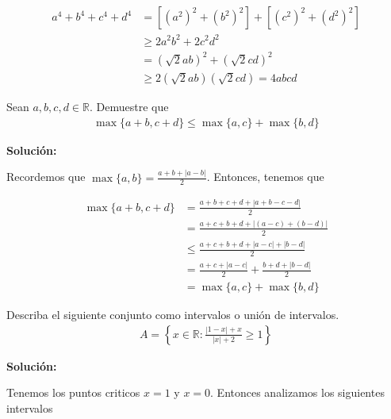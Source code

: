 \documentclass[12pt]{book}
\begin{document}
\begin{align*}
     a^4+b^4+c^4+d^4&=[ (a^2)^2+(b^2)^2]+[(c^2)^2+(d^2)^2] \\
     &\geq2a^2b^2+ 2c^2d^2 \\
     &=(\sqrt{2}ab)^2+(\sqrt{2}cd)^2 \\
     &\geq2(\sqrt{2}ab)(\sqrt{2}cd)=4abcd
\end{align*}

\begin{prob}{}{}
    Sean $a,b,c,d \in \mathbb{R}$. Demuestre que 
    \begin{align*}
        \max\{a+b,c+d\} \leq \max\{a,c\}+\max\{b,d\}
    \end{align*}
\end{prob}

\textbf{Solución:}

Recordemos que $\max\{a,b\}=\frac{a+b+|a-b|}{2}$. Entonces, tenemos que 

\begin{align*}
     \max\{a+b,c+d\} &=\frac{a+b+c+d+|a+b-c-d|}{2} \\
     &=\frac{a+c+b+d+|(a-c)+(b-d)|}{2} \\
     &\leq \frac{a+c+b+d+|a-c|+|b-d|}{2} \\
     &=\frac{a+c+|a-c|}{2}+\frac{b+d+|b-d|}{2}   \\
     &=\max\{a,c\}+\max\{b,d\}
\end{align*}

\begin{prob}{}{}
    Describa el siguiente conjunto como intervalos o unión de intervalos.
    \begin{align*}
        A=\left\{x \in \mathbb{R} : \frac{|1-x|+x}{|x|+2}\geq1\right\}
    \end{align*}
\end{prob}
\textbf{Solución:}

Tenemos los puntos criticos $x=1$ y $x=0$. Entonces analizamos los siguientes intervalos
\end{document}
